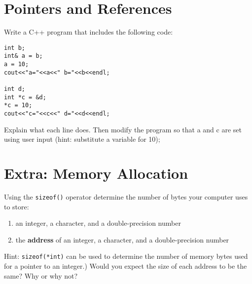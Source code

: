 \documentclass{article}
\begin{document}
\section{Pointers and References}
Write a C++ program that includes the following code:
\begin{verbatim}
int b;
int& a = b;
a = 10;
cout<<"a="<<a<<" b="<<b<<endl;

int d;
int *c = &d;
*c = 10;
cout<<"c="<<c<<" d="<<d<<endl;
\end{verbatim}
Explain what each line does. Then modify the program so that a and c are set using user input (hint: substitute a variable for 10); 

\section*{Extra: Memory Allocation}
Using the \texttt{sizeof()} operator determine the number of bytes your computer uses to store:
\begin{enumerate}
	\item an integer, a character, and a double-precision number
	\item the \textbf{address} of an integer, a character, and a double-precision number
\end{enumerate}
Hint: \texttt{sizeof(*int)} can be used to determine the number of memory bytes used for a pointer to an integer.) Would you expect the size of each address to be the same? Why or why not?
\end{document}
